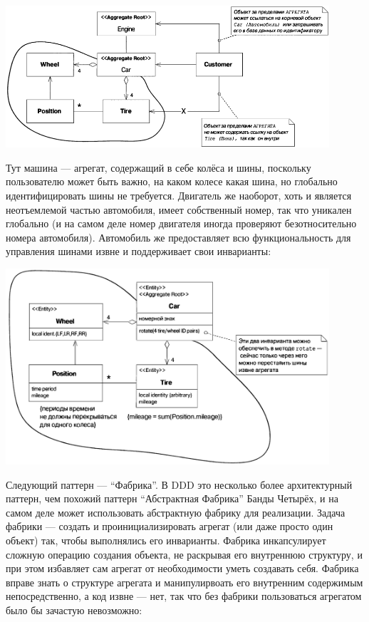 \documentclass[a5paper]{article}
\begin{document}
\begin{center}
    \includegraphics[width=0.9\textwidth]{aggregate.png}
\end{center}

Тут машина --- агрегат, содержащий в себе колёса и шины, поскольку пользователю может быть важно, на каком колесе какая шина, но глобально идентифицировать шины не требуется. Двигатель же наоборот, хоть и является неотъемлемой частью автомобиля, имеет собственный номер, так что уникален глобально (и на самом деле номер двигателя иногда проверяют безотносительно номера автомобиля). Автомобиль же предоставляет всю функциональность для управления шинами извне и поддерживает свои инварианты:

\begin{center}
    \includegraphics[width=0.9\textwidth]{aggregateInvariants.png}
\end{center}

Следующий паттерн --- ``Фабрика''. В DDD это несколько более архитектурный паттерн, чем похожий паттерн ``Абстрактная Фабрика'' Банды Четырёх, и на самом деле может использовать абстрактную фабрику для реализации. Задача фабрики --- создать и проинициализировать агрегат (или даже просто один объект) так, чтобы выполнялись его инварианты. Фабрика инкапсулирует сложную операцию создания объекта, не раскрывая его внутреннюю структуру, и при этом избавляет сам агрегат от необходимости уметь создавать себя. Фабрика вправе знать о структуре агрегата и манипулирвоать его внутренним содержимым непосредственно, а код извне --- нет, так что без фабрики пользоваться агрегатом было бы зачастую невозможно:
\end{document}
